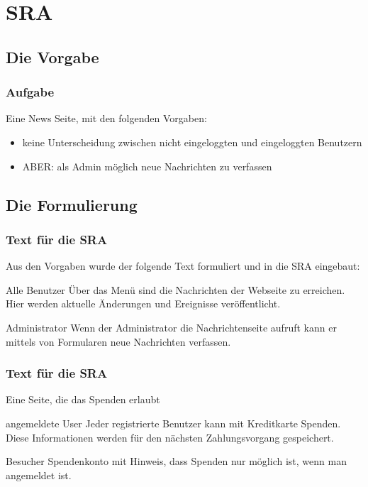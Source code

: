 \section{SRA}
\subsection{Die Vorgabe}
\begin{frame} %
  \frametitle{Aufgabe} %

Eine News Seite, mit den folgenden Vorgaben:
  \begin{itemize}
   \item keine Unterscheidung zwischen nicht eingeloggten und eingeloggten Benutzern
   \item ABER: als Admin möglich neue Nachrichten zu verfassen
  \end{itemize}

\end{frame}

\subsection{Die Formulierung}
\begin{frame} %
  \frametitle{Text für die SRA} %

  Aus den Vorgaben wurde der folgende Text formuliert und in die SRA eingebaut:
  \begin{block}{Alle Benutzer}
	Über das Menü sind die Nachrichten der Webseite zu erreichen. Hier werden aktuelle Änderungen und Ereignisse veröffentlicht.
  \end{block}
  \begin{block}{Administrator}
  	Wenn der Administrator die Nachrichtenseite aufruft kann er mittels von Formularen neue Nachrichten verfassen.
   \end{block}
  
\end{frame}


\begin{frame} %
  \frametitle{Text für die SRA} %

 Eine Seite, die das Spenden erlaubt
  \begin{block}{angemeldete User}
	Jeder registrierte Benutzer kann mit Kreditkarte Spenden. Diese Informationen werden für den nächsten Zahlungsvorgang
	gespeichert.
  \end{block}
  \begin{block}{Besucher}
  	Spendenkonto mit Hinweis, dass Spenden nur möglich ist, wenn man angemeldet ist. 
   \end{block}
  

\end{frame}
